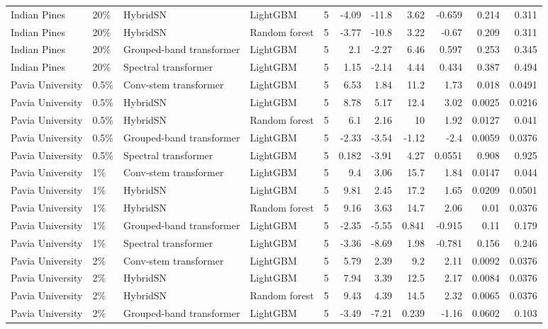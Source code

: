 \begin{table}
\begin{tabular}{llllrrrrrrr}
Indian Pines & 20\% & HybridSN & LightGBM & 5 & -4.09 & -11.8 & 3.62 & -0.659 & 0.214 & 0.311 \\
Indian Pines & 20\% & HybridSN & Random forest & 5 & -3.77 & -10.8 & 3.22 & -0.67 & 0.209 & 0.311 \\
Indian Pines & 20\% & Grouped-band transformer & LightGBM & 5 & 2.1 & -2.27 & 6.46 & 0.597 & 0.253 & 0.345 \\
Indian Pines & 20\% & Spectral transformer & LightGBM & 5 & 1.15 & -2.14 & 4.44 & 0.434 & 0.387 & 0.494 \\
Pavia University & 0.5\% & Conv-stem transformer & LightGBM & 5 & 6.53 & 1.84 & 11.2 & 1.73 & 0.018 & 0.0491 \\
Pavia University & 0.5\% & HybridSN & LightGBM & 5 & 8.78 & 5.17 & 12.4 & 3.02 & 0.0025 & 0.0216 \\
Pavia University & 0.5\% & HybridSN & Random forest & 5 & 6.1 & 2.16 & 10 & 1.92 & 0.0127 & 0.041 \\
Pavia University & 0.5\% & Grouped-band transformer & LightGBM & 5 & -2.33 & -3.54 & -1.12 & -2.4 & 0.0059 & 0.0376 \\
Pavia University & 0.5\% & Spectral transformer & LightGBM & 5 & 0.182 & -3.91 & 4.27 & 0.0551 & 0.908 & 0.925 \\
Pavia University & 1\% & Conv-stem transformer & LightGBM & 5 & 9.4 & 3.06 & 15.7 & 1.84 & 0.0147 & 0.044 \\
Pavia University & 1\% & HybridSN & LightGBM & 5 & 9.81 & 2.45 & 17.2 & 1.65 & 0.0209 & 0.0501 \\
Pavia University & 1\% & HybridSN & Random forest & 5 & 9.16 & 3.63 & 14.7 & 2.06 & 0.01 & 0.0376 \\
Pavia University & 1\% & Grouped-band transformer & LightGBM & 5 & -2.35 & -5.55 & 0.841 & -0.915 & 0.11 & 0.179 \\
Pavia University & 1\% & Spectral transformer & LightGBM & 5 & -3.36 & -8.69 & 1.98 & -0.781 & 0.156 & 0.246 \\
Pavia University & 2\% & Conv-stem transformer & LightGBM & 5 & 5.79 & 2.39 & 9.2 & 2.11 & 0.0092 & 0.0376 \\
Pavia University & 2\% & HybridSN & LightGBM & 5 & 7.94 & 3.39 & 12.5 & 2.17 & 0.0084 & 0.0376 \\
Pavia University & 2\% & HybridSN & Random forest & 5 & 9.43 & 4.39 & 14.5 & 2.32 & 0.0065 & 0.0376 \\
Pavia University & 2\% & Grouped-band transformer & LightGBM & 5 & -3.49 & -7.21 & 0.239 & -1.16 & 0.0602 & 0.103 \\

\end{tabular}
\end{table}
